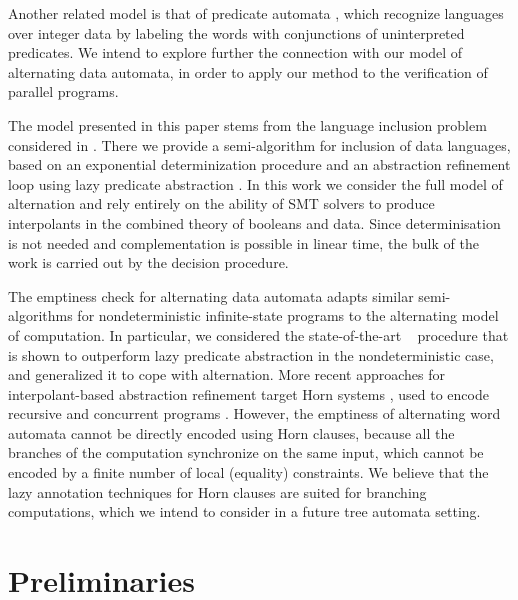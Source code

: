 \documentclass[10pt,conference,letterpaper,twocolumn]{IEEEtran}
\begin{document}

Another related model is that of predicate automata \cite{Farzan15},
which recognize languages over integer data by labeling the words with
conjunctions of uninterpreted predicates. We intend to explore further
the connection with our model of alternating data automata, in order
to apply our method to the verification of parallel programs.

The model presented in this paper stems from the language inclusion
problem considered in \cite{Tacas16}. There we provide a
semi-algorithm for inclusion of data languages, based on an
exponential determinization procedure and an abstraction refinement
loop using lazy predicate abstraction \cite{HJMS02}. In this work we
consider the full model of alternation and rely entirely on the
ability of SMT solvers to produce interpolants in the combined theory
of booleans and data. Since determinisation is not needed and
complementation is possible in linear time, the bulk of the work is
carried out by the decision procedure.

The emptiness check for alternating data automata adapts similar
semi-algorithms for nondeterministic infinite-state programs to the
alternating model of computation. In particular, we considered the
state-of-the-art \impact~ procedure \cite{mcmillan06} that is shown to
outperform lazy predicate abstraction \cite{HJMS02} in the
nondeterministic case, and generalized it to cope with
alternation. More recent approaches for interpolant-based abstraction
refinement target Horn systems \cite{McMillan14,Hoder12}, used to
encode recursive and concurrent programs
\cite{Grebenshchikov12}. However, the emptiness of alternating word
automata cannot be directly encoded using Horn clauses, because all
the branches of the computation synchronize on the same input, which
cannot be encoded by a finite number of local (equality)
constraints. We believe that the lazy annotation techniques for Horn
clauses are suited for branching computations, which we intend to
consider in a future tree automata setting.

\section{Preliminaries}
\end{document}
